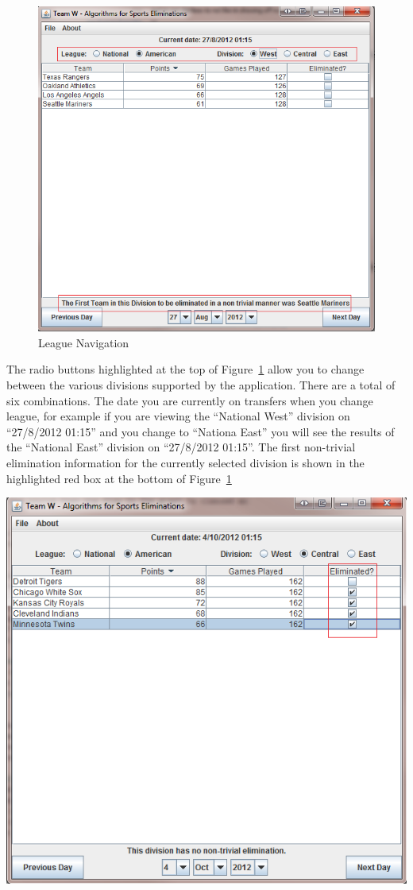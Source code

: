 \begin{figure}
  \includegraphics[width=\linewidth,keepaspectratio]{images/userManualDesk3.png}
  \caption{League Navigation}\label{fig:LEAGNAV}
\end{figure}
The radio buttons highlighted at the top of Figure~\ref{fig:LEAGNAV}
allow you to change between the various divisions supported by the
application. There are a total of six combinations. The date you
are currently on transfers when you change league, for example if you
are viewing the ``National West'' division on ``27/8/2012 01:15'' and
you change to ``Nationa East'' you will see the results of the
``National East'' division on ``27/8/2012 01:15''. The first
non-trivial elimination information for the currently selected
division is shown in the highlighted red box at the bottom of
Figure~\ref{fig:LEAGNAV}

\includegraphics[width=\linewidth,keepaspectratio]{images/userManualDesk4.png}

